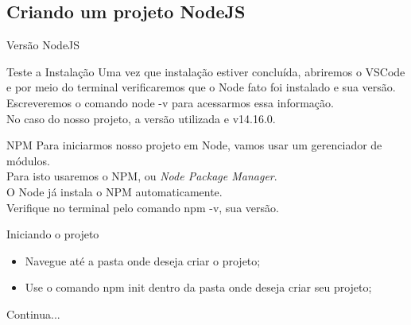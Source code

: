 \documentclass{beamer}
\begin{document}
    \subsection{Criando um projeto NodeJS}
    \begin{frame}[label=simmonshall]{Versão NodeJS}

      \begin{block}{Teste a Instalação}
        Uma vez que instalação estiver concluída, abriremos o VSCode e por meio do terminal verificaremos que o Node fato foi instalado e sua versão. \\
        Escreveremos o comando \alert{node -v} para acessarmos essa informação.\\
        No caso do nosso projeto, a versão utilizada e v14.16.0.
      \end{block}
      \begin{exampleblock}{NPM}
        Para iniciarmos nosso projeto em Node, vamos usar um gerenciador de módulos.\\
        Para isto usaremos o NPM, ou \textit{Node Package Manager}.\\
        O Node já instala o NPM automaticamente.\\
        Verifique no terminal pelo comando \alert{npm -v}, sua versão.
      \end{exampleblock}
    \end{frame}
    \begin{frame}[label=proof]{Iniciando o projeto}
	\begin{itemize}
	\item Navegue até a pasta onde deseja criar o projeto;
	\item Use o comando \alert{npm init} dentro da pasta onde deseja criar seu projeto;
	\end{itemize}
	Continua...
    \end{frame}
    
\end{document}
